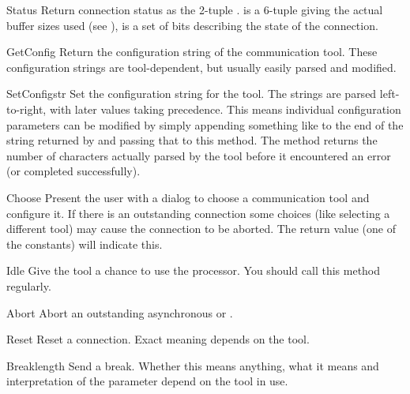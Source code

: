 \begin{funcdesc}{Status}{}
Return connection status as the 2-tuple .  is a 6-tuple giving the actual buffer sizes used
(see ),  is a set of bits describing the state
of the connection.
\end{funcdesc}

\begin{funcdesc}{GetConfig}{}
Return the configuration string of the communication tool. These
configuration strings are tool-dependent, but usually easily parsed
and modified.
\end{funcdesc}

\begin{funcdesc}{SetConfig}{str}
Set the configuration string for the tool. The strings are parsed
left-to-right, with later values taking precedence. This means
individual configuration parameters can be modified by simply appending
something like  to the end of the string returned by
 and passing that to this method. The method returns
the number of characters actually parsed by the tool before it
encountered an error (or completed successfully).
\end{funcdesc}

\begin{funcdesc}{Choose}{}
Present the user with a dialog to choose a communication tool and
configure it. If there is an outstanding connection some choices (like
selecting a different tool) may cause the connection to be
aborted. The return value (one of the  constants) will
indicate this.
\end{funcdesc}

\begin{funcdesc}{Idle}{}
Give the tool a chance to use the processor. You should call this
method regularly.
\end{funcdesc}

\begin{funcdesc}{Abort}{}
Abort an outstanding asynchronous  or .
\end{funcdesc}

\begin{funcdesc}{Reset}{}
Reset a connection. Exact meaning depends on the tool.
\end{funcdesc}

\begin{funcdesc}{Break}{length}
Send a break. Whether this means anything, what it means and
interpretation of the  parameter depend on the tool in
use.
\end{funcdesc}

